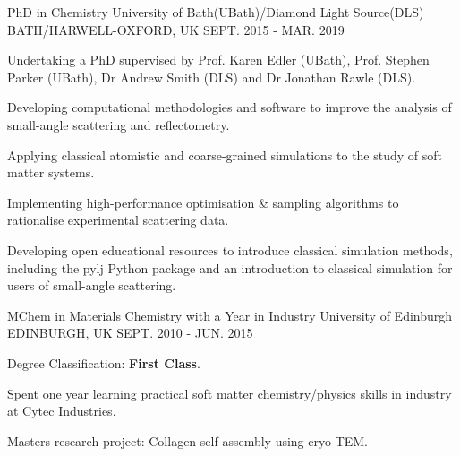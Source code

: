 \begin{cventries}
  \cventry
    {PhD in Chemistry}
    {University of Bath(UBath)/Diamond Light Source(DLS)}
    {BATH/HARWELL-OXFORD, UK}
    {SEPT. 2015 - MAR. 2019}
    {
      \begin{cvitems}
        \item {Undertaking a PhD supervised by Prof. Karen Edler (UBath), Prof. Stephen Parker (UBath), Dr Andrew Smith (DLS) and Dr Jonathan Rawle (DLS).}
        \item {Developing computational methodologies and software to improve the analysis of small-angle scattering and reflectometry.}
        \item {Applying classical atomistic and coarse-grained simulations to the study of soft matter systems.}
        \item {Implementing high-performance optimisation \& sampling algorithms to rationalise experimental scattering data.}
        \item {Developing open educational resources to introduce classical simulation methods, including the pylj Python package and an introduction to classical simulation for users of small-angle scattering.}
      \end{cvitems}
    }
  \cventry
    {MChem in Materials Chemistry with a Year in Industry}
    {University of Edinburgh}
    {EDINBURGH, UK}
    {SEPT. 2010 - JUN. 2015}
    {
      \begin{cvitems}
        \item {Degree Classification: \textbf{First Class}.}
        \item {Spent one year learning practical soft matter chemistry/physics skills in industry at Cytec Industries.}
        \item {Masters research project: Collagen self-assembly using cryo-TEM.}
      \end{cvitems}
    }
\end{cventries}
